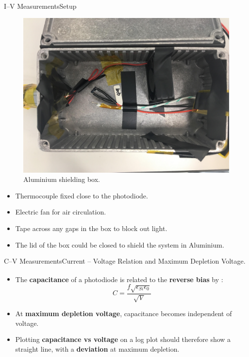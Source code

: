 \documentclass{beamer}
\begin{document}
    \begin{frame}{I--V Measurements}{Setup}
        \begin{minipage}{0.6\linewidth}
        \begin{figure}
            \centering
            \includegraphics[width = \linewidth]{Photodiode_Box.jpg}
            \caption{Aluminium shielding box.}
        \end{figure}
        \end{minipage}%
        \begin{minipage}{0.4\linewidth}
        \begin{itemize}
            \item Thermocouple fixed close to the photodiode.
            \item Electric fan for air circulation.
            \item Tape across any gaps in the box to block out light.
            \item The lid of the box could be closed to shield the system in Aluminium.
        \end{itemize}
        \end{minipage}
    \end{frame}
    
    \begin{frame}{C--V Measurements}{Current -- Voltage Relation and Maximum Depletion Voltage.}
        \begin{itemize}
            \item The \textbf{capacitance} of a photodiode is related to the \textbf{reverse bias} by \textsuperscript{\cite{Casse}}:
                \begin{equation*}
                    C = \frac{f\sqrt{\epsilon_{Si}\epsilon_0}}{\sqrt{V}}
                \end{equation*}
            \item At \textbf{maximum depletion voltage}, capacitance becomes independent of voltage.
            \vspace{0.5cm}
            \item Plotting \textbf{capacitance vs voltage} on a log plot should therefore show a straight line, with a \textbf{deviation} at maximum depletion.
        \end{itemize}
    \end{frame}
    
\end{document}
